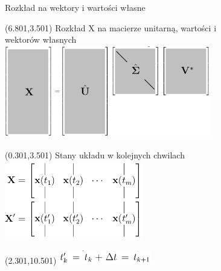 \documentclass[aspectratio=169]{beamer}
\begin{document}
\begin{frame} {Rozkład na wektory i wartości własne}
\begin{textblock}{13}(6.801,3.501)
	Rozkład X na macierze unitarną, wartości i \\ wektorów własnych \\
	\includegraphics[width=9cm]{imgs/a_economy_svd_alf.png}
\end{textblock}
\begin{textblock}{13}(0.301,3.501)
	Stany układu w kolejnych chwilach \\
	\includegraphics[width=6cm]{imgs/a_X_svd.png}
\end{textblock}
\begin{textblock}{13}(2.301,10.501)
	\includegraphics[width=4cm]{imgs/a_t_svd.png}
\end{textblock}
\end{frame}
\end{document}
